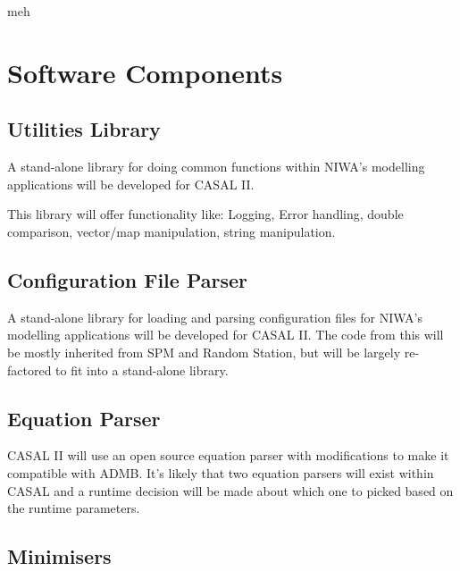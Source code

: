 \documentclass[a4paper,11pt,twoside,pdftex,draft]{article}
\begin{document}
meh

\hypertarget{software-components}{%
\section[Software
Components]{\texorpdfstring{\protect\hypertarget{anchor-18}{}{}Software
Components}{Software Components}}\label{software-components}}

\hypertarget{utilities-library}{%
\subsection[Utilities
Library]{\texorpdfstring{\protect\hypertarget{anchor-19}{}{}Utilities
Library}{Utilities Library}}\label{utilities-library}}

A stand-alone library for doing common functions within NIWA's modelling
applications will be developed for CASAL II.

This library will offer functionality like: Logging, Error handling,
double comparison, vector/map manipulation, string manipulation.

\hypertarget{configuration-file-parser}{%
\subsection[Configuration File
Parser]{\texorpdfstring{\protect\hypertarget{anchor-20}{}{}Configuration
File
Parser}{Configuration File Parser}}\label{configuration-file-parser}}

A stand-alone library for loading and parsing configuration files for
NIWA's modelling applications will be developed for CASAL II. The code
from this will be mostly inherited from SPM and Random Station, but will
be largely re-factored to fit into a stand-alone library.

\hypertarget{equation-parser}{%
\subsection[Equation
Parser]{\texorpdfstring{\protect\hypertarget{anchor-21}{}{}Equation
Parser}{Equation Parser}}\label{equation-parser}}

CASAL II will use an open source equation parser with modifications to
make it compatible with ADMB. It's likely that two equation parsers will
exist within CASAL and a runtime decision will be made about which one
to picked based on the runtime parameters.

\hypertarget{minimisers}{%
\subsection[Minimisers]{\texorpdfstring{\protect\hypertarget{anchor-22}{}{}Minimisers}{Minimisers}}\label{minimisers}}
\end{document}
